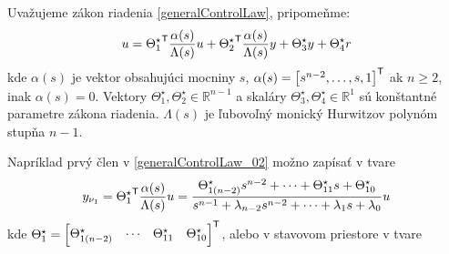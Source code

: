 \documentclass[a4paper, 10pt, ]{article}
\begin{document}
Uvažujeme zákon riadenia \eqref{generalControlLaw}, pripomeňme:
\begin{equation} \label{generalControlLaw_02}
	u = {\Theta_1^\star}^{\mathsf{T}} \frac{\alpha(s)}{\Lambda(s)} u + {\Theta_2^\star}^{\mathsf{T}} \frac{\alpha(s)}{\Lambda(s)} y + \Theta_3^\star y + \Theta_4^\star r
\end{equation}
kde $\alpha(s)$ je vektor obsahujúci mocniny $s$, $\alpha(s) = \begin{bmatrix} s^{n-2}, \ldots, s, 1 \end{bmatrix}^{\mathsf{T}}$ ak $n\geq 2$, inak $\alpha(s) = 0$. Vektory ${\Theta_1^\star}, \Theta_2^\star \in \mathbb{R}^{n-1}$ a skaláry $\Theta_3^\star, \Theta_4^\star \in \mathbb{R}^1$ sú konštantné parametre zákona riadenia. $\Lambda(s)$ je ľubovoľný monický Hurwitzov polynóm stupňa $n-1$.

Napríklad prvý člen v \eqref{generalControlLaw_02} možno zapísať v tvare
\begin{equation}
	y_{\nu_1} = {\Theta_1^\star}^{\mathsf{T}} \frac{\alpha(s)}{\Lambda(s)} u
    =
	\frac{
	\Theta_{1(n-2)}^\star s^{n-2}    + \cdots + \Theta_{11}^\star s + \Theta_{10}^\star
	}{
	s^{n-1}+ \lambda_{n-2} s^{n-2} + \cdots + \lambda_1 s + \lambda_0
	}
	u
\end{equation}
kde $ \Theta_1^\star = \begin{bmatrix} \Theta_{1(n-2)}^\star  & \cdots & \Theta_{11}^\star & \Theta_{10}^\star \end{bmatrix}^{\mathsf{T}} $, alebo v stavovom priestore v tvare
\end{document}
